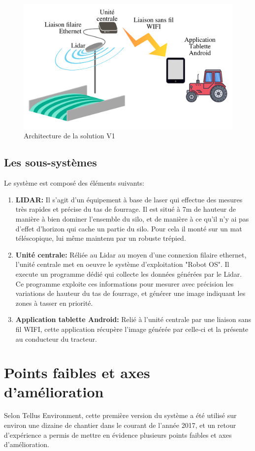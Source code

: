 \documentclass[12pt,a4paper]{report}
\begin{document}
\begin{figure}[H]
	\centering
	\includegraphics[width=0.7\linewidth]{img/ArchiGenV1}
	\caption{Architecture de la solution V1}
	\label{fig:archigenv1}
\end{figure}


\subsection{Les sous-systèmes}
Le système est composé des éléments suivants:

\begin{enumerate}
	\item \textbf{LIDAR:} Il s'agit d'un équipement à base de laser qui effectue des mesures très rapides et précise du tas de fourrage. Il est situé à 7m de hauteur de manière à bien dominer l'ensemble du silo, et de manière à ce qu'il n'y ai pas d'effet d'horizon qui cache un partie du silo. Pour cela il monté sur un mat téléscopique, lui même maintenu par un robuste trépied.
	
	\item \textbf{Unité centrale:} Réliée au Lidar au moyen d'une connexion filaire ethernet, l'unité centrale met en oeuvre le système d'exploitation "Robot OS". Il execute un programme dédié qui collecte les données générées par le Lidar. Ce programme exploite ces informations pour mesurer avec précision les variations de hauteur du tas de fourrage, et générer une image indiquant les zones à tasser en priorité.
	
	\item \textbf{Application tablette Android:} Relié à l'unité centrale par une liaison sans fil WIFI, cette application récupère l'image générée par celle-ci et la présente au conducteur du tracteur.
\end{enumerate}

\section{Points faibles et axes d'amélioration}
Selon Tellus Environment, cette première version du système a été utilisé sur environ une dizaine de chantier dans le courant de l'année 2017, et un retour d'expérience a permis de mettre en évidence plusieurs points faibles et axes d'amélioration.
\end{document}
